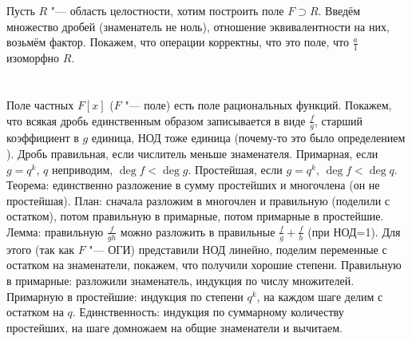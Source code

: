 \section{} %
Пусть $R$ "--- область целостности, хотим построить поле $F \supset R$.
Введём множество дробей (знаменатель не ноль), отношение эквивалентности на них, возьмём фактор.
Покажем, что операции корректны, что это поле, что $\frac a 1$ изоморфно $R$.

\section{} %
Поле частных $F[x]$ ($F$ "--- поле) есть поле рациональных функций.
Покажем, что всякая дробь единственным образом записывается в виде $\frac f g$, старший коэффициент в $g$ единица, НОД тоже единица
(почему-то это было определением \TODO).
Дробь правильная, если числитель меньше знаменателя.
Примарная, если $g=q^k$, $q$ неприводим, $\deg f < \deg g$.
Простейшая, если $g=q^k$, $\deg f < \deg q$.
Теорема: единственно разложение в сумму простейших и многочлена (он не простейшая).
План: сначала разложим в многочлен и правильную (поделили с остатком), потом правильную в примарные, потом примарные в простейшие.
Лемма: правильную $\frac{f}{gh}$ можно разложить в правильные $\frac fg + \frac fh$ (при НОД=1).
Для этого (так как $F$ "--- ОГИ) представили НОД линейно, поделим переменные с остатком на знаменатели, покажем, что получили хорошие степени.
Правильную в примарные: разложили знаменатель, индукция по числу множителей.
Примарную в простейшие: индукция по степени $q^k$, на каждом шаге делим с остатком на $q$.
Единственность: индукция по суммарному количеству простейших, на шаге домножаем на общие знаменатели и вычитаем.
